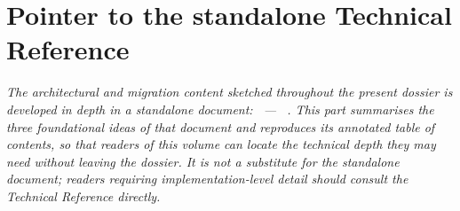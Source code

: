 \documentclass[11pt,a4paper,twoside]{book}
\let\oldsection\section
\begin{document}
\setcounter{section}{0}
\renewcommand{\section}{\clearpage\oldsection}
\renewcommand{\theHsection}{reg.\arabic{section}}
\glsresetall



\part{Pointer to the standalone Technical Reference}
\label{annex:tech-ref-pointer}


\setcounter{section}{0}
\renewcommand{\section}{\oldsection}
\glsresetall

\begin{tcolorbox}[
    colback=Slate!4!white,
    colframe=Slate!60!black,
    boxrule=0.6pt,
    sharp corners=south,
    left=8pt, right=8pt, top=6pt, bottom=6pt,
    title={\textbf{About this part}}
]
\itshape
\noindent
The architectural and migration content sketched throughout the
present dossier is developed in depth in a standalone document:
\emph{\suitsolutiontitle\ --- \suitsolutionsubtitle}~\cite{ng-tech-ref-2026}. This part
summarises the three foundational ideas of that document and
reproduces its annotated table of contents, so that readers of
this volume can locate the technical depth they may need without
leaving the dossier. It is not a substitute for the standalone
document; readers requiring implementation-level detail should
consult the Technical Reference directly.
\end{tcolorbox}
\end{document}
